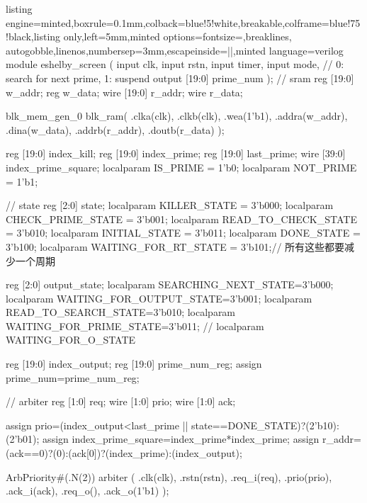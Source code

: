 \documentclass[a4paper]{article}
\begin{document}
\begin{tcblisting}{listing engine=minted,boxrule=0.1mm,colback=blue!5!white,breakable,colframe=blue!75!black,listing only,left=5mm,minted options={fontsize=\small,breaklines, autogobble,linenos,numbersep=3mm,escapeinside=||},minted language=verilog}
    module eshelby_screen (
        input clk,
        input rstn,
        input timer,
        input mode,     // 0: search for next prime, 1: suspend
        output [19:0] prime_num
    );
        // sram
        reg [19:0] w_addr;
        reg  w_data;
        wire [19:0] r_addr;
        wire  r_data;

        blk_mem_gen_0 blk_ram(
            .clka(clk),
            .clkb(clk),
            .wea(1'b1),
            .addra(w_addr),
            .dina(w_data),
            .addrb(r_addr),
            .doutb(r_data)
        );

        reg [19:0] index_kill;
        reg [19:0] index_prime;
        reg [19:0] last_prime;
        wire [39:0] index_prime_square;
        localparam IS_PRIME = 1'b0;
        localparam NOT_PRIME = 1'b1;


        // state
        reg [2:0] state;
        localparam KILLER_STATE = 3'b000;
        localparam CHECK_PRIME_STATE = 3'b001;
        localparam READ_TO_CHECK_STATE = 3'b010;
        localparam INITIAL_STATE = 3'b011;
        localparam DONE_STATE = 3'b100;
        localparam WAITING_FOR_RT_STATE = 3'b101;// 所有这些都要减少一个周期

        reg [2:0] output_state;
        localparam SEARCHING_NEXT_STATE=3'b000;
        localparam WAITING_FOR_OUTPUT_STATE=3'b001;
        localparam READ_TO_SEARCH_STATE=3'b010;
        localparam WAITING_FOR_PRIME_STATE=3'b011;
        // localparam WAITING_FOR_O_STATE

        reg [19:0] index_output;
        reg [19:0] prime_num_reg;
        assign prime_num=prime_num_reg;

        // arbiter
        reg [1:0] req;
        wire [1:0] prio;
        wire [1:0] ack;

        assign prio=(index_output<last_prime || state==DONE_STATE)?(2'b10):(2'b01);
        assign index_prime_square=index_prime*index_prime;
        assign r_addr=(ack==0)?(0):(ack[0])?(index_prime):(index_output);

        ArbPriority#(.N(2)) arbiter (
            .clk(clk),
            .rstn(rstn),
            .req_i(req),
            .prio(prio),
            .ack_i(ack),
            .req_o(),
            .ack_o(1'b1)
        );


\end{tcblisting}
\end{document}
